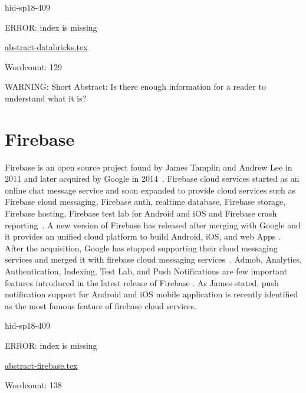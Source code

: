 \begin{IU}

hid-sp18-409

ERROR: index is missing

\href{https://github.com/cloudmesh-community/hid-sp18-409/blob/master//technology/abstract-databricks.tex}{abstract-databricks.tex}

 

Wordcount: 129

WARNING: Short Abstract: Is there enough information for a reader to understand what it is?

\end{IU}

\section{Firebase}

Firebase is an open source project found by James Tamplin and Andrew Lee in 2011
and later acquired by Google in 2014~\cite{hid-sp18-409-www-firebase}. Firebase
cloud services started as an online chat message service and soon expanded to
provide cloud services such as Firebase cloud messaging, Firebase auth, realtime
database, Firebase storage, Firebase hosting, Firebase test lab for Android and
iOS and Firebase crash reporting~\cite{hid-sp18-409-www-firebase-official}. A
new version of Firebase has released after merging with Google and it provides
an unified cloud platform to build Android, iOS, and web Apps
\cite{hid-sp18-409-www-firebase-official}. After the acquisition, Google has
stopped supporting their cloud messaging services and merged it with firebase
cloud messaging services~\cite{hid-sp18-409-www-firebase-merged}. Admob,
Analytics, Authentication, Indexing, Test Lab, and Push Notifications are few
important features introduced in the latest release of Firebase
\cite{hid-sp18-409-www-firebase-official}. As James
\cite{hid-sp18-409-www-firebase} stated, push notification support for Android
and iOS mobile application is recently identified as the most famous feature of
firebase cloud services.


\begin{IU}

hid-sp18-409

ERROR: index is missing

\href{https://github.com/cloudmesh-community/hid-sp18-409/blob/master//technology/abstract-firebase.tex}{abstract-firebase.tex}

 

Wordcount: 138

\end{IU}

